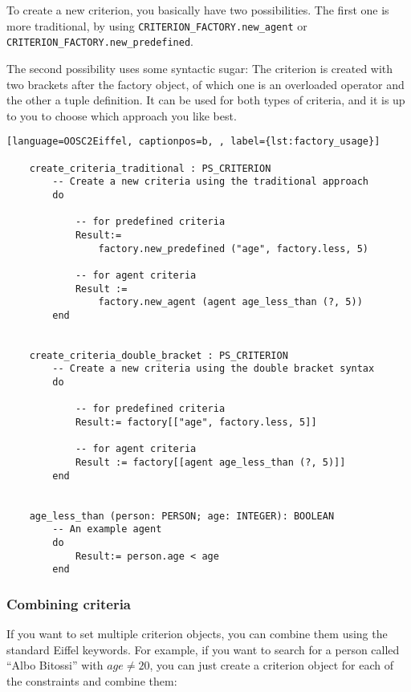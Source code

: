 To create a new criterion, you basically have two possibilities.
The first one is more traditional, by using \lstinline!CRITERION_FACTORY.new_agent! or \lstinline!CRITERION_FACTORY.new_predefined!.

The second possibility uses some syntactic sugar:
The criterion is created with two brackets after the factory object, of which one is an overloaded operator and the other a tuple definition.
It can be used for both types of criteria, and it is up to you to choose which approach you like best.

\begin{lstlisting}[language=OOSC2Eiffel, captionpos=b, , label={lst:factory_usage}]

	create_criteria_traditional : PS_CRITERION
		-- Create a new criteria using the traditional approach
		do

			-- for predefined criteria
			Result:= 
				factory.new_predefined ("age", factory.less, 5)

			-- for agent criteria
			Result := 
				factory.new_agent (agent age_less_than (?, 5))
		end


	create_criteria_double_bracket : PS_CRITERION
		-- Create a new criteria using the double bracket syntax
		do

			-- for predefined criteria
			Result:= factory[["age", factory.less, 5]]

			-- for agent criteria
			Result := factory[[agent age_less_than (?, 5)]]
		end			


	age_less_than (person: PERSON; age: INTEGER): BOOLEAN
		-- An example agent
		do
			Result:= person.age < age
		end

\end{lstlisting}



\subsubsection{Combining criteria}

If you want to set multiple criterion objects, you can combine them using the standard Eiffel keywords. 
For example, if you want to search for a person called ``Albo Bitossi'' with $age \ne 20$, you can just create a criterion object for each of the constraints and combine them:  

